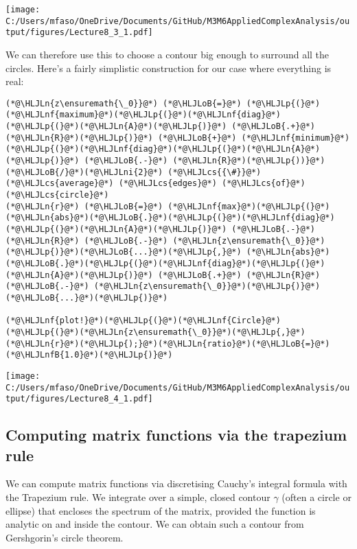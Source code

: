 \documentclass[12pt,a4paper]{article}
\newcommand{\HLJLn}[1]{#1}
\newcommand{\HLJLnf}[1]{\textcolor[RGB]{66,102,213}{#1}}
\newcommand{\HLJLnfB}[1]{\textcolor[RGB]{59,151,46}{#1}}
\newcommand{\HLJLni}[1]{\textcolor[RGB]{59,151,46}{#1}}
\newcommand{\HLJLoB}[1]{\textcolor[RGB]{102,102,102}{\textbf{#1}}}
\newcommand{\HLJLp}[1]{#1}
\newcommand{\HLJLcs}[1]{\textcolor[RGB]{153,153,119}{\textit{#1}}}
\begin{document}
\texttt{[image: C:/Users/mfaso/OneDrive/Documents/GitHub/M3M6AppliedComplexAnalysis/output/figures/Lecture8\_3\_1.pdf]}

We can therefore use this to choose a contour big enough to surround all the circles. Here's a fairly simplistic construction for our case where everything is real:


\begin{lstlisting}
(*@\HLJLn{z\ensuremath{\_0}}@*) (*@\HLJLoB{=}@*) (*@\HLJLp{(}@*)(*@\HLJLnf{maximum}@*)(*@\HLJLp{(}@*)(*@\HLJLnf{diag}@*)(*@\HLJLp{(}@*)(*@\HLJLn{A}@*)(*@\HLJLp{)}@*) (*@\HLJLoB{.+}@*) (*@\HLJLn{R}@*)(*@\HLJLp{)}@*) (*@\HLJLoB{+}@*) (*@\HLJLnf{minimum}@*)(*@\HLJLp{(}@*)(*@\HLJLnf{diag}@*)(*@\HLJLp{(}@*)(*@\HLJLn{A}@*)(*@\HLJLp{)}@*) (*@\HLJLoB{.-}@*) (*@\HLJLn{R}@*)(*@\HLJLp{))}@*) (*@\HLJLoB{/}@*)(*@\HLJLni{2}@*) (*@\HLJLcs{{\#}}@*) (*@\HLJLcs{average}@*) (*@\HLJLcs{edges}@*) (*@\HLJLcs{of}@*) (*@\HLJLcs{circle}@*)
(*@\HLJLn{r}@*) (*@\HLJLoB{=}@*) (*@\HLJLnf{max}@*)(*@\HLJLp{(}@*)(*@\HLJLn{abs}@*)(*@\HLJLoB{.}@*)(*@\HLJLp{(}@*)(*@\HLJLnf{diag}@*)(*@\HLJLp{(}@*)(*@\HLJLn{A}@*)(*@\HLJLp{)}@*) (*@\HLJLoB{.-}@*) (*@\HLJLn{R}@*) (*@\HLJLoB{.-}@*) (*@\HLJLn{z\ensuremath{\_0}}@*)(*@\HLJLp{)}@*)(*@\HLJLoB{...}@*)(*@\HLJLp{,}@*) (*@\HLJLn{abs}@*)(*@\HLJLoB{.}@*)(*@\HLJLp{(}@*)(*@\HLJLnf{diag}@*)(*@\HLJLp{(}@*)(*@\HLJLn{A}@*)(*@\HLJLp{)}@*) (*@\HLJLoB{.+}@*) (*@\HLJLn{R}@*) (*@\HLJLoB{.-}@*) (*@\HLJLn{z\ensuremath{\_0}}@*)(*@\HLJLp{)}@*)(*@\HLJLoB{...}@*)(*@\HLJLp{)}@*)

(*@\HLJLnf{plot!}@*)(*@\HLJLp{(}@*)(*@\HLJLnf{Circle}@*)(*@\HLJLp{(}@*)(*@\HLJLn{z\ensuremath{\_0}}@*)(*@\HLJLp{,}@*) (*@\HLJLn{r}@*)(*@\HLJLp{);}@*)(*@\HLJLn{ratio}@*)(*@\HLJLoB{=}@*)(*@\HLJLnfB{1.0}@*)(*@\HLJLp{)}@*)
\end{lstlisting}

\texttt{[image: C:/Users/mfaso/OneDrive/Documents/GitHub/M3M6AppliedComplexAnalysis/output/figures/Lecture8\_4\_1.pdf]}

\subsection{Computing matrix functions via the trapezium rule}
We can compute matrix functions via discretising Cauchy's integral formula with the Trapezium rule. We integrate over a simple, closed contour $\gamma$ (often a circle or ellipse) that encloses the spectrum of the matrix, provided the function is analytic on and inside the contour. We can obtain such a contour from Gershgorin's circle theorem.
\end{document}
